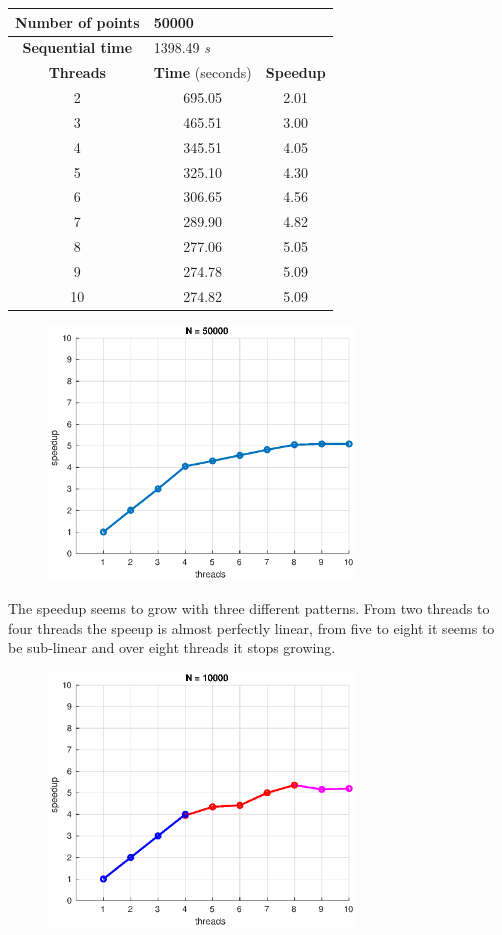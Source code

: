 \documentclass[10pt,twocolumn,letterpaper]{article}
\begin{document}
\begin{table}[H]
\centering
\begin{tabular}{ccc}
\hline
\textbf{Number of points} & \multicolumn{2}{l}{50000} \\
\hline
\textbf{Sequential time} & \multicolumn{2}{l}{1398.49 \textit{s}} \\
\hline
\textbf{Threads} & \textbf{Time} (seconds) & \textbf{Speedup} \\
\hline
2 & 695.05 & 2.01 \\
3 & 465.51 & 3.00 \\
4 & 345.51 & 4.05 \\
5 & 325.10 & 4.30 \\
6 & 306.65 & 4.56 \\
7 & 289.90 & 4.82 \\
8 & 277.06 & 5.05 \\
9 & 274.78 & 5.09 \\
10 & 274.82 & 5.09 \\
\hline
\end{tabular}
\end{table}

\begin{figure}[H]
\centering
\includegraphics[width=3.2in]{fig/speedup50000.eps}

\end{figure}
The speedup seems to grow with three different patterns. From two threads to four threads the speeup is almost perfectly linear, from five to eight it seems to be sub-linear and over eight threads it stops growing.

\begin{figure}[H]
\centering
\includegraphics[width=3.2in]{fig/speedup10000Colors.eps}
\end{figure}
\end{document}
